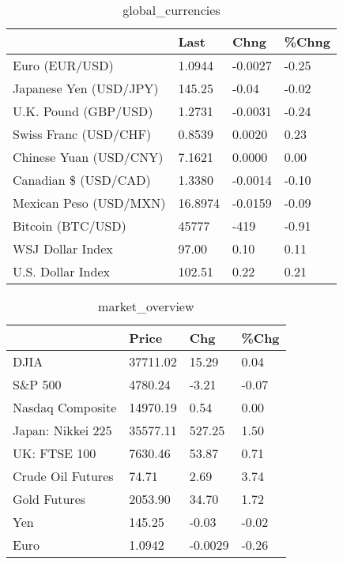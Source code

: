\documentclass{article}%
\begin{document}
%


\begin{table}[htbp]%
\caption{global\_currencies}%
\centering%
\begin{adjustbox}{width=1\textwidth}%
\begin{tabular}{llll}
\toprule
                       &    Last &    Chng & \%Chng \\
\midrule
        Euro (EUR/USD) &  1.0944 & -0.0027 & -0.25 \\
Japanese Yen (USD/JPY) &  145.25 &   -0.04 & -0.02 \\
  U.K. Pound (GBP/USD) &  1.2731 & -0.0031 & -0.24 \\
 Swiss Franc (USD/CHF) &  0.8539 &  0.0020 &  0.23 \\
Chinese Yuan (USD/CNY) &  7.1621 &  0.0000 &  0.00 \\
  Canadian \$ (USD/CAD) &  1.3380 & -0.0014 & -0.10 \\
Mexican Peso (USD/MXN) & 16.8974 & -0.0159 & -0.09 \\
     Bitcoin (BTC/USD) &   45777 &    -419 & -0.91 \\
      WSJ Dollar Index &   97.00 &    0.10 &  0.11 \\
     U.S. Dollar Index &  102.51 &    0.22 &  0.21 \\
\bottomrule
\end{tabular}
%
\end{adjustbox}%
\end{table}

%


\begin{table}[htbp]%
\caption{market\_overview}%
\centering%
\begin{adjustbox}{width=1\textwidth}%
\begin{tabular}{llll}
\toprule
                  &    Price &     Chg &  \%Chg \\
\midrule
             DJIA & 37711.02 &   15.29 &  0.04 \\
          S\&P 500 &  4780.24 &   -3.21 & -0.07 \\
 Nasdaq Composite & 14970.19 &    0.54 &  0.00 \\
Japan: Nikkei 225 & 35577.11 &  527.25 &  1.50 \\
     UK: FTSE 100 &  7630.46 &   53.87 &  0.71 \\
Crude Oil Futures &    74.71 &    2.69 &  3.74 \\
     Gold Futures &  2053.90 &   34.70 &  1.72 \\
              Yen &   145.25 &   -0.03 & -0.02 \\
             Euro &   1.0942 & -0.0029 & -0.26 \\
\bottomrule
\end{tabular}
%
\end{adjustbox}%
\end{table}

%
\end{document}
